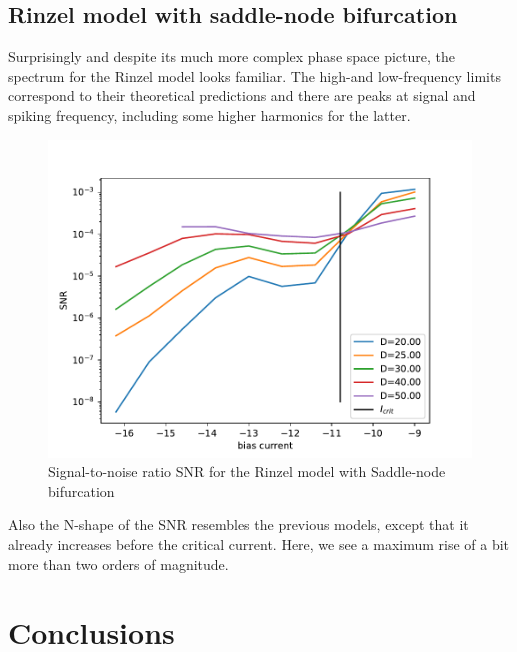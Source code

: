 \documentclass[12pt,a4paper]{article}
\begin{document}
\subsection{Rinzel model with saddle-node bifurcation}
Surprisingly and despite its much more complex phase space picture, the spectrum for the Rinzel model looks familiar. The high-and low-frequency limits correspond to their theoretical predictions and there are peaks at signal and spiking frequency, including some higher harmonics for the latter.
\begin{figure}[H]
	\centering
	\includegraphics[scale=1]{snrinzelcrit.pdf}\caption{Signal-to-noise ratio SNR for the Rinzel model with Saddle-node bifurcation}
	\label{specrinzel}
\end{figure}
Also the N-shape of the SNR resembles the previous models, except that it already increases before the critical current. Here, we see a maximum rise of a bit more than two orders of magnitude.  
\section{Conclusions}



\end{document}
